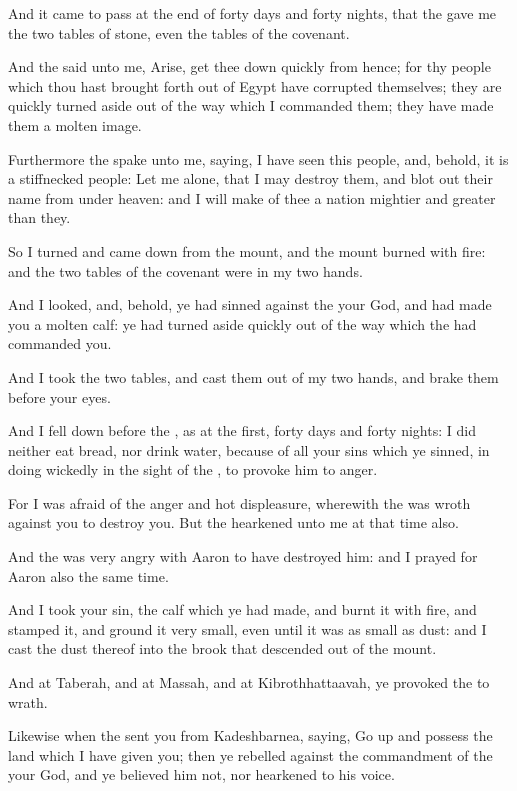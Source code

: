 \verse And it came to pass at the end of forty days and forty nights, that the \LORD gave me the two tables of stone, even the tables of the covenant.

\verse And the \LORD said unto me, Arise, get thee down quickly from hence; for thy people which thou hast brought forth out of Egypt have corrupted themselves; they are quickly turned aside out of the way which I commanded them; they have made them a molten image.

\verse Furthermore the \LORD spake unto me, saying, I have seen this people, and, behold, it is a stiffnecked people: \verse Let me alone, that I may destroy them, and blot out their name from under heaven: and I will make of thee a nation mightier and greater than they.

\verse So I turned and came down from the mount, and the mount burned with fire: and the two tables of the covenant were in my two hands.

\verse And I looked, and, behold, ye had sinned against the \LORD your God, and had made you a molten calf: ye had turned aside quickly out of the way which the \LORD had commanded you.

\verse And I took the two tables, and cast them out of my two hands, and brake them before your eyes.

\verse And I fell down before the \LORD, as at the first, forty days and forty nights: I did neither eat bread, nor drink water, because of all your sins which ye sinned, in doing wickedly in the sight of the \LORD, to provoke him to anger.

\verse For I was afraid of the anger and hot displeasure, wherewith the \LORD was wroth against you to destroy you. But the \LORD hearkened unto me at that time also.

\verse And the \LORD was very angry with Aaron to have destroyed him: and I prayed for Aaron also the same time.

\verse And I took your sin, the calf which ye had made, and burnt it with fire, and stamped it, and ground it very small, even until it was as small as dust: and I cast the dust thereof into the brook that descended out of the mount.

\verse And at Taberah, and at Massah, and at Kibrothhattaavah, ye provoked the \LORD to wrath.

\verse Likewise when the \LORD sent you from Kadeshbarnea, saying, Go up and possess the land which I have given you; then ye rebelled against the commandment of the \LORD your God, and ye believed him not, nor hearkened to his voice.

